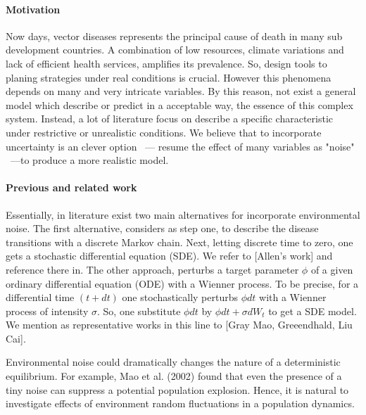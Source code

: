 \paragraph{Motivation}
	Now days, vector diseases represents the principal cause of death in 
many sub development countries. A combination of low resources, climate
variations and lack of efficient health services, amplifies its prevalence. So, 
design tools to planing strategies under real conditions is crucial. However
this phenomena depends on many and very intricate variables. 
By this reason, not exist a general model which  describe or predict in a
acceptable way, the essence of this complex system. Instead, a lot of literature
focus on describe a specific characteristic under restrictive or unrealistic 
conditions. We believe that to incorporate uncertainty is an clever option
~--- resume the effect of many variables as "noise" ~---to produce a more 
realistic model.

	

\paragraph{Previous and related work}
	Essentially, in literature exist two main alternatives 
	for incorporate environmental noise. The first alternative, considers as step 
	one, to describe the disease transitions with a discrete Markov chain. Next,
	letting discrete time to zero, one gets a stochastic differential equation 
	(SDE). We refer to [Allen's work] and reference there in. The other approach, 
	perturbs a target parameter $\phi$ of a given  ordinary differential equation 
	(ODE) with a Wienner process. To be precise, for a differential time 
	$(t+dt)$  
	one  stochastically perturbs $\phi dt$ with a Wienner process of intensity 
	$\sigma$. So, one substitute $\phi dt$ by $\phi dt+\sigma dW_t$  to get a SDE
	model. We mention as representative works in this line to [Gray Mao,
	 Greeendhald, Liu Cai].

		Environmental noise could dramatically changes the nature of a deterministic
	equilibrium. For example, Mao et al. (2002) found that 
	even the presence of a tiny noise can suppress a potential population 
	explosion. Hence, it is natural to investigate effects of environment random 
	fluctuations in a population dynamics.

